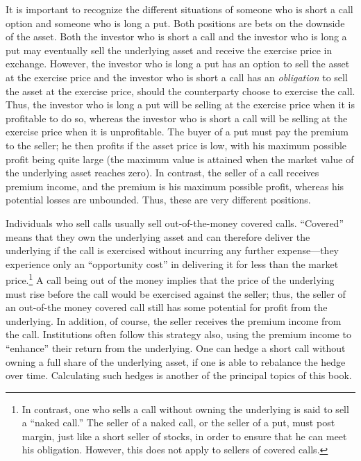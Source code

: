 It is important to recognize the different situations of someone who is short a call option and someone who is long a put.  Both positions are bets on the downside of the asset.  Both the investor who is short a call and the investor who is long a put may eventually sell the underlying asset  and receive the exercise price in exchange.  However, the investor who is long a put has an option to sell the asset at the exercise price and the investor who is short a call has an \emph{obligation} to sell the asset at the exercise price, should the counterparty choose to exercise the call.  Thus, the investor who is long a put will be selling at the exercise price when it is profitable to do so, whereas the investor who is short a call will be selling at the exercise price when it is unprofitable.  The buyer of a put must pay the premium to the seller; he then profits if the asset price is low, with his maximum possible profit being quite large (the maximum value is attained when the market value of the underlying asset reaches zero).  In contrast, the seller of a call receives premium income, and the premium is his maximum possible profit, whereas his potential losses are unbounded.  Thus, these are very different positions.

Individuals who sell calls usually sell out-of-the-money covered calls.  ``Covered''  means that they own the underlying asset and can therefore deliver the underlying if the call is exercised without incurring any further expense---they experience only an ``opportunity cost'' in delivering it for less than the market price.\footnote{In contrast, one who sells a call without owning the underlying is said to sell a ``naked call.''   The seller of a naked call, or the seller of a put, must post margin, just like a short seller of stocks, in order to ensure that he can meet his obligation.  However, this does not apply to sellers of covered calls.}  A  call being out of the money implies that the price of the underlying must rise before the call would be exercised against the seller; thus, the seller of an out-of-the money covered call still has some potential for profit from the underlying.  In addition, of course, the seller receives the premium income from the call.  Institutions often follow this strategy also, using the premium income to ``enhance'' their return from the underlying.     One can hedge a short call without owning a full share of the underlying asset, if one is able to rebalance the hedge over time.  Calculating such hedges is another of the principal topics of this book.

